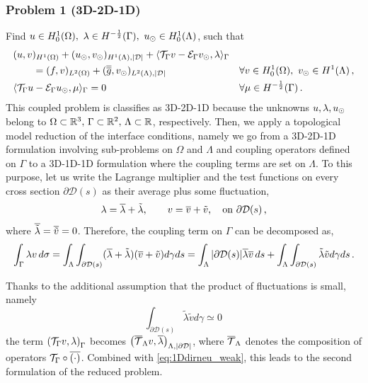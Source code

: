 \documentclass[r]{siamart171218}
\begin{document}
\subsubsection*{Problem 1 (3D-2D-1D)}
Find $u \in H^1_0(\Omega), \ \lambda \in H^{-\frac12}(\Gamma ),\ u_{\odot} \in H^1_0(\Lambda)$, such that
\begin{subequations}\label{eq:problem1}
\begin{align}
&(u,v)_{H^1(\Omega)} + (u_{\odot},v_{\odot})_{H^1(\Lambda),|\mathcal{D}|} 
+ \langle {\mathcal{T}_\Gamma} v  - \mathcal{E}_\Gamma v_{\odot}, \lambda \rangle_\Gamma &&
\\
\nonumber
&\qquad= (f,v)_{L^2(\Omega)} +  (\overline{\overline{g}},v_{\odot})_{L^2(\Lambda),|\mathcal{D}|}
\quad &&\forall v \in H^1_0(\Omega), \ v_{\odot} \in H^1(\Lambda)\,,
\\
& \langle {\mathcal{T}_\Gamma} u - \mathcal{E}_\Gamma u_{\odot} , \mu \rangle_\Gamma = 0
\quad && \forall \mu \in H^{-\frac12}(\Gamma)\,.
\end{align}
\end{subequations}
This coupled problem is classifies as 3D-2D-1D because the unknowns $u,\lambda,u_{\odot}$ belong to 
$\Omega \subset \mathbb{R}^3,\, \Gamma \subset \mathbb{R}^2,\, \Lambda \subset \mathbb{R}$, respectively.
Then, we apply a topological model reduction of the interface conditions, namely we go from a 3D-2D-1D formulation
involving sub-problems on $\Omega$ and $\Lambda$ and coupling operators defined on $\Gamma$
to a 3D-1D-1D formulation where the coupling terms are set on $\Lambda$. 
To this purpose, let us write the Lagrange multiplier and the test functions on every cross section $\partial\mathcal{D}(s)$ as their average plus some fluctuation,
\begin{equation*}
\lambda=\overline{\lambda}+\tilde{\lambda}, \qquad v=\overline{v}+\tilde{v},
\quad \text{on} \ \partial\mathcal{D}(s)\,,
\end{equation*}
where $\overline{\tilde{\lambda}}=\overline{\tilde{v}}=0$. 
Therefore, the coupling term on $\Gamma$ can be decomposed as,
\begin{equation*}
\int_{\Gamma}\lambda v\, d\sigma
=\int _{\Lambda}  \int_{\partial\mathcal{D}(s)} (\overline{\lambda}+\tilde{\lambda})(\overline{v}+\tilde{v})d\gamma ds
= \int_{\Lambda}|\partial\mathcal{D}(s)| \overline{\lambda}\overline{v}\,ds+\int_{\Lambda}  \int_{\partial\mathcal{D}(s)} \tilde{\lambda}\tilde{v}d\gamma ds\,.
\end{equation*}

Thanks to the additional assumption that the product of fluctuations is small, namely
\begin{equation*}
\int_{\partial\mathcal{D}(s)} \tilde{\lambda}\tilde{v} d\gamma \simeq 0\,
\end{equation*}
the term $\left({\mathcal{T}_\Gamma} v, \lambda \right)_{\Gamma}$ becomes $\left( {\overline{\mathcal{T}}_\Lambda} v, \overline{\lambda} \right)_{\Lambda, |\partial\mathcal{D}|}$, where ${\overline{\mathcal{T}}_\Lambda}$ denotes the composition of operators ${\mathcal{T}_\Gamma} \circ \overline{(\cdot)}$.  Combined with \eqref{eq:1Ddirneu_weak}, this leads to the second formulation of the reduced problem.
\end{document}
